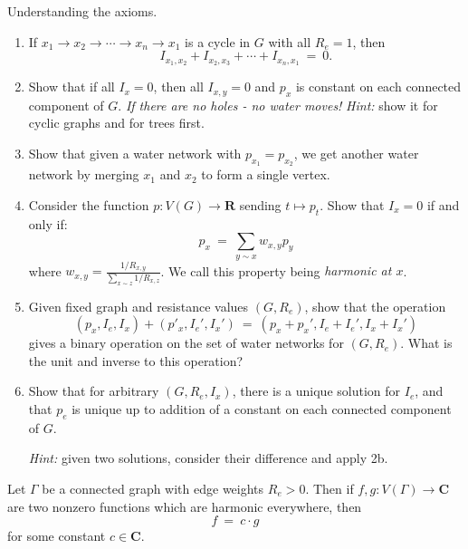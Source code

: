 \documentclass[11pt,fleqn]{book} %
\begin{document}
\begin{problem}
  Understanding the axioms.
   \begin{enumerate}[label =\alph*.]
    \item If $x_1 \to x_2 \to \cdots \to x_n \to x_1$ is a cycle in $G$ with all $R_e=1$, then 
        $$I_{x_1,x_2}+ I_{x_2,x_3}+ \cdots + I_{x_n,x_1} \ = \ 0.$$
    \item Show that if all $I_x=0$, then all $I_{x,y}=0$ and $p_x$ is constant on each connected component of $G$. \textit{If there are no holes - no water moves!} \textit{Hint:} show it for cyclic graphs and for trees first.
    \item Show that given a water network with $p_{x_1}=p_{x_2}$, we get another water network by merging $x_1$ and $x_2$ to form a single vertex. 
    \item Consider the function $p:V(G) \to \mathbf{R}$ sending $t\mapsto p_t$. Show that $I_x=0$ if and only if:
    $$p_x \ = \ \sum_{y\sim x}w_{x,y}p_y$$
    where $w_{x,y}= \frac{1/R_{x,y}}{\sum_{x\sim z}1/R_{x,z}}$. We call this property being \textit{harmonic at $x$}.
    \item Given fixed graph and resistance values $(G,R_e)$, show that the operation 
    $$(p_x,I_e,I_x)+(p'_x,I_e',I_x') \ = \ (p_x+p_x',I_e+I_e',I_x+I_x')$$ 
    gives a binary operation on the set of water networks for $(G,R_e)$. What is the unit and inverse to this operation?
    \item Show that for arbitrary $(G,R_e,I_x)$, there is a unique solution for $I_e$, and that $p_e$ is unique up to addition of a constant on each connected component of $G$.
    
    \textit{Hint:} given two solutions, consider their difference and apply 2b. 
   \end{enumerate} 
\end{problem}



\begin{theorem}
   Let $\Gamma$ be a connected graph with edge weights $R_e>0$. Then if $f,g:V(\Gamma)\to \mathbf{C}$ are two nonzero functions which are harmonic everywhere, then  
   $$f \ = \ c\cdot g$$
   for some constant $c\in \mathbf{C}$.
\end{theorem}

\end{document}
